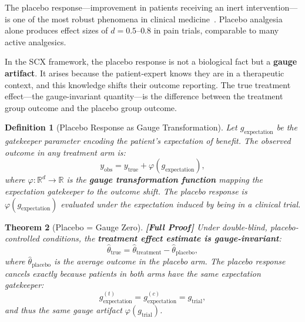 \documentclass[12pt,a4paper]{article}
\newtheorem{theorem}{Theorem}[section]
\newtheorem{definition}[theorem]{Definition}
\theoremstyle{remark}
\newcommand{\R}{\mathbb{R}}
\newcommand{\SCX}{\textsf{SCX}}
\newcommand{\rigorFull}{\textbf{[Full Proof]}}
\begin{document}
The placebo response---improvement in patients receiving an inert
intervention---is one of the most robust phenomena in clinical
medicine~\cite{beecher1955powerful,hrobjartsson2001placebo}. Placebo
analgesia alone produces effect sizes of $d = 0.5$--$0.8$ in pain trials,
comparable to many active analgesics.

In the \SCX{} framework, the placebo response is not a biological fact but
a \textbf{gauge artifact}. It arises because the patient-expert knows they
are in a therapeutic context, and this knowledge shifts their outcome
reporting. The true treatment effect---the gauge-invariant quantity---is the
difference between the treatment group outcome and the placebo group
outcome.

\begin{definition}[Placebo Response as Gauge Transformation]
\label{def:placebo_gauge}
Let $g_{\text{expectation}}$ be the gatekeeper parameter encoding the
patient's expectation of benefit. The observed outcome in any treatment
arm is:
\begin{equation}
  y_{\text{obs}} = y_{\text{true}} + \varphi(g_{\text{expectation}}),
\end{equation}
where $\varphi: \R^d \to \R$ is the \textbf{gauge transformation function}
mapping the expectation gatekeeper to the outcome shift. The placebo
response is $\varphi(g_{\text{expectation}})$ evaluated under the
expectation induced by being in a clinical trial.
\end{definition}

\begin{theorem}[Placebo = Gauge Zero]
\label{thm:placebo_gauge_zero}
\rigorFull
Under double-blind, placebo-controlled conditions, the \textbf{treatment
effect estimate is gauge-invariant}:
\begin{equation}
  \hat{\theta}_{\text{true}} = \hat{\theta}_{\text{treatment}} -
  \hat{\theta}_{\text{placebo}},
\end{equation}
where $\hat{\theta}_{\text{placebo}}$ is the average outcome in the
placebo arm. The placebo response cancels exactly because patients in both
arms have the same expectation gatekeeper:
\begin{equation}
  g_{\text{expectation}}^{(t)} = g_{\text{expectation}}^{(c)} = g_{\text{trial}},
\end{equation}
and thus the same gauge artifact $\varphi(g_{\text{trial}})$.
\end{theorem}
\end{document}
